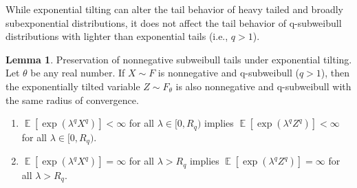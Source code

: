 \documentclass{article}
\theoremstyle{definition}
\newtheorem{lemma}{Lemma}[theorem]
\DeclareMathOperator{\E}{\mathbb{E}}
\begin{document}
While exponential tilting can alter the tail behavior of heavy tailed and broadly subexponential distributions, it does not affect the tail behavior of q-subweibull distributions with lighter than exponential tails (i.e., $q>1$).

\begin{lemma}
\label{lem:exp-tilt-nonneg}
Preservation of nonnegative subweibull tails under exponential tilting. Let $\theta$ be any real number.
If $X\sim F$ is nonnegative and q-subweibull ($q>1$), then the exponentially tilted variable $Z\sim F_\theta$ is also nonnegative and q-subweibull with the same radius of convergence.
\begin{enumerate}%
  \item $\E[\exp(\lambda^q X^q)]<\infty$ for all $\lambda\in [0,R_q)$ implies $\E[\exp(\lambda^q Z^q)]<\infty$ for all $\lambda\in [0,R_q)$.
  \item $\E[\exp(\lambda^q X^q)]=\infty$ for all $\lambda>R_q$ implies $\E[\exp(\lambda^q Z^q)]=\infty$ for all $\lambda>R_q$. 
\end{enumerate}
\end{lemma}
\end{document}

